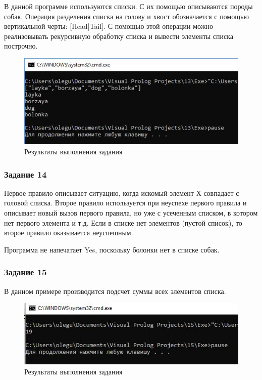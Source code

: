 \documentclass[14pt,a4paper,report]{report}
\begin{document}
В данной программе используются списки. С их помощью описываются породы собак. Операция разделения списка на голову и хвост обозначается с помощью вертикальной черты: [Head|Tail]. С помощью этой операции можно реализовывать рекурсивную обработку списка и вывести элементы списка построчно.



\begin{figure}[h!]
	\centering
	\includegraphics[scale = 0.9]{images/d13.png}
	\caption{Результаты выполнения задания}
\end{figure}
\clearpage
\subsubsection{Задание 14}

Первое правило описывает ситуацию, когда искомый элемент Х совпадает с головой списка. Второе правило используется при неуспехе первого правила и описывает новый вызов первого правила, но уже с усеченным списком, в котором нет первого элемента и т.д. Если в списке нет элементов (пустой список), то второе правило оказывается неуспешным.

Программа не напечатает Yes, поскольку болонки нет в списке собак.




\clearpage
\subsubsection{Задание 15}

В данном примере производится подсчет суммы всех элементов списка. 



\begin{figure}[h!]
	\centering
	\includegraphics[scale = 0.9]{images/d15.png}
	\caption{Результаты выполнения задания}
\end{figure}
\clearpage
\end{document}
